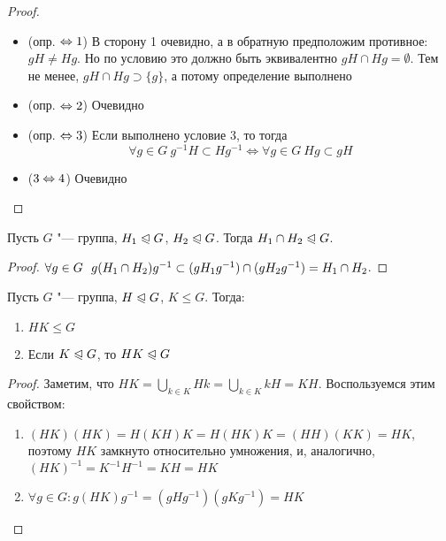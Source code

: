 \begin{proof}~
	 \begin{itemize}
	 	\item (опр. $\Leftrightarrow 1$) В сторону 1 очевидно, а в обратную предположим противное: $gH \neq Hg$. Но по условию это должно быть эквивалентно $gH \cap Hg = \emptyset$. Тем не менее, $gH \cap Hg \supset \{g\}$, а потому определение выполнено
	 	
	 	\item (опр. $\Leftrightarrow 2$) Очевидно
	 	
	 	\item (опр. $\Leftrightarrow 3$) Если выполнено условие 3, то тогда
	 	\[
	 		\forall g \in G\ g^{-1}H \subset Hg^{-1} \Longleftrightarrow \forall g \in G\ Hg \subset gH
	 	\]
	 	
	 	\item ($3 \Leftrightarrow 4$) Очевидно
	 \end{itemize}
\end{proof}

\begin{proposition}
	Пусть $G$ "--- группа, $H_1 \trianglelefteqslant G$, $H_2 \trianglelefteqslant G$. Тогда $H_1 \cap H_2 \hm\normal G$.
\end{proposition}

\begin{proof}
	$\forall g \in G\ \ g(H_1 \cap H_2)g^{-1} \subset (gH_1g^{-1}) \cap (gH_2g^{-1}) \hm= H_1 \cap H_2$.
\end{proof}

\begin{proposition}
	Пусть $G$ "--- группа, $H \trianglelefteqslant G$, $K \le G$. Тогда:
	\begin{enumerate}
		\item $HK \le G$
		\item Если $K \trianglelefteqslant G$, то $HK \trianglelefteqslant G$
	\end{enumerate}
\end{proposition}

\begin{proof}
	Заметим, что $HK = \bigcup_{k \in K}Hk = \bigcup_{k \in K}kH = KH$. Воспользуемся этим свойством:
	\begin{enumerate}
		\item $(HK)(HK) = H(KH)K = H(HK)K = (HH)(KK) = HK$, поэтому $HK$ замкнуто относительно умножения, и, аналогично, $(HK)^{-1} = K^{-1}H^{-1} = KH = HK$
		\item $\forall g \in G: g(HK)g^{-1} = (gHg^{-1})(gKg^{-1}) = HK$
	\end{enumerate}
\end{proof}

